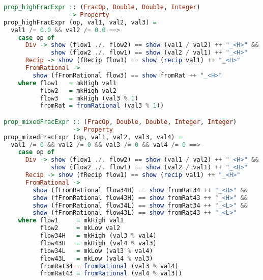 \begin{lstlisting}[language=Haskell]
prop_highFracExpr :: (FracOp, Double, Double, Integer)
                  -> Property
prop_highFracExpr (op, val1, val2, val3) =
  val1 /= 0.0 && val2 /= 0.0 ==>
    case op of
      Div -> show (flow1 ./. flow2) == show (val1 / val2) ++ "_<H>" &&
             show (flow2 ./. flow1) == show (val2 / val1) ++ "_<H>"
      Recip -> show (fRecip flow1) == show (recip val1) ++ "_<H>"
      FromRational ->
        show (fFromRational flow3) == show fromRat ++ "_<H>"
    where flow1   = mkHigh val1
          flow2   = mkHigh val2
          flow3   = mkHigh (val3 % 1)
          fromRat = fromRational (val3 % 1))

prop_mixedFracExpr :: (FracOp, Double, Double, Integer, Integer)
                   -> Property
prop_mixedFracExpr (op, val1, val2, val3, val4) =
  val1 /= 0 && val2 /= 0 && val3 /= 0 && val4 /= 0 ==>
    case op of
      Div -> show (flow1 ./. flow2) == show (val1 / val2) ++ "_<H>" &&
             show (flow2 ./. flow1) == show (val2 / val1) ++ "_<H>"
      Recip -> show (fRecip flow1) == show (recip val1) ++ "_<H>"
      FromRational ->
        show (fFromRational flow34H) == show fromRat34 ++ "_<H>" &&
        show (fFromRational flow43H) == show fromRat43 ++ "_<H>" &&
        show (fFromRational flow34L) == show fromRat34 ++ "_<L>" &&
        show (fFromRational flow43L) == show fromRat43 ++ "_<L>"
    where flow1     = mkHigh val1
          flow2     = mkLow val2
          flow34H   = mkHigh (val3 % val4)
          flow43H   = mkHigh (val4 % val3)
          flow34L   = mkLow (val3 % val4)
          flow43L   = mkLow (val4 % val3)
          fromRat34 = fromRational (val3 % val4)
          fromRat43 = fromRational (val4 % val3))
\end{lstlisting}
